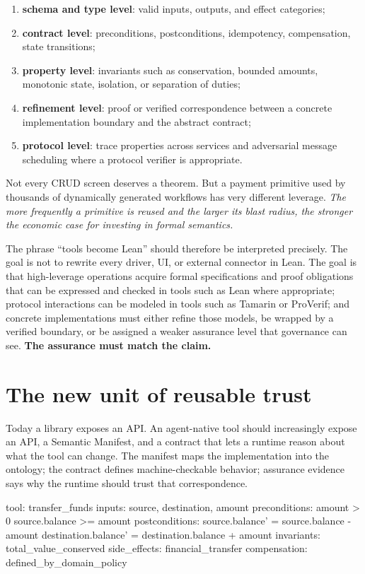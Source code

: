 \documentclass[10pt,oneside,openany]{book}
\begin{document}
\begin{enumerate}
\item \textbf{schema and type level}: valid inputs, outputs, and effect categories;
\item \textbf{contract level}: preconditions, postconditions, idempotency, compensation, state transitions;
\item \textbf{property level}: invariants such as conservation, bounded amounts, monotonic state, isolation, or separation of duties;
\item \textbf{refinement level}: proof or verified correspondence between a concrete implementation boundary and the abstract contract;
\item \textbf{protocol level}: trace properties across services and adversarial message scheduling where a protocol verifier is appropriate.
\end{enumerate}

Not every CRUD screen deserves a theorem. But a payment primitive used by thousands of dynamically generated workflows has very different leverage. \emph{The more frequently a primitive is reused and the larger its blast radius, the stronger the economic case for investing in formal semantics.}

The phrase ``tools become Lean'' should therefore be interpreted precisely. The goal is not to rewrite every driver, UI, or external connector in Lean. The goal is that high-leverage operations acquire formal specifications and proof obligations that can be expressed and checked in tools such as Lean where appropriate; protocol interactions can be modeled in tools such as Tamarin or ProVerif; and concrete implementations must either refine those models, be wrapped by a verified boundary, or be assigned a weaker assurance level that governance can see. \textbf{The assurance must match the claim.}

\section{The new unit of reusable trust}
Today a library exposes an API. An agent-native tool should increasingly expose an API, a Semantic Manifest, and a contract that lets a runtime reason about what the tool can change. The manifest maps the implementation into the ontology; the contract defines machine-checkable behavior; assurance evidence says why the runtime should trust that correspondence.

\begin{codeblock}
tool: transfer_funds
inputs: source, destination, amount
preconditions:
  amount > 0
  source.balance >= amount
postconditions:
  source.balance' = source.balance - amount
  destination.balance' = destination.balance + amount
invariants:
  total_value_conserved
side_effects:
  financial_transfer
compensation:
  defined_by_domain_policy
\end{codeblock}
\end{document}
